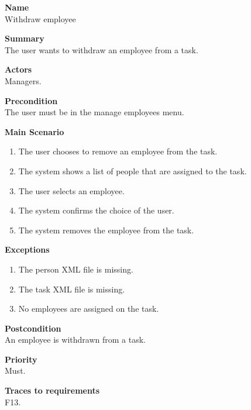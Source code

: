 \documentclass[12pt]{article}
\begin{document}
\noindent
{\bf Name}\\
Withdraw employee

\noindent
{\bf Summary}\\
The user wants to withdraw an employee from a task.

\noindent
{\bf Actors}\\
Managers.

\noindent
{\bf Precondition}\\
The user must be in the manage employees menu.

\noindent
{\bf Main Scenario}\\
\vspace*{-0.35in}
\begin{enumerate}
\item The user chooses to remove an employee from the task.
\vspace*{-0.1in}
\item The system shows a list of people that are assigned to the task.
\vspace*{-0.1in}
\item The user selects an employee.
\vspace*{-0.1in}
\item The system confirms the choice of the user.
\vspace*{-0.1in}
\item The system removes the employee from the task.
\end{enumerate}
\vspace*{-0.1in}

\noindent
{\bf Exceptions}\\
\vspace*{-0.35in}
\begin{enumerate}
\item The person XML file is missing.
\vspace*{-0.1in}
\item The task XML file is missing.
\vspace*{-0.1in}
\item No employees are assigned on the task.
\end{enumerate}
\vspace*{-0.1in}

\noindent
{\bf Postcondition}\\
An employee is withdrawn from a task.

\noindent
{\bf Priority}\\
Must.

\noindent
{\bf Traces to requirements}\\
F13.
\end{document}
